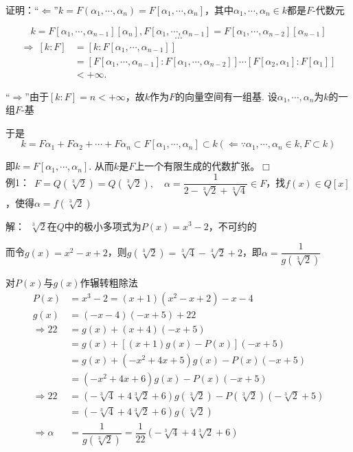 \documentclass[UTF8]{article}
\begin{document}
证明：“$\Longleftarrow$”\quad $k=F\left( \alpha_1,\cdots,\alpha_n\right)=F\left[ \alpha_1,\cdots,\alpha_n\right]$，其中$\alpha_1,\cdots,\alpha_n\in k$都是$F$-代数元

$$k=F\left[ \alpha_1,\cdots,\alpha_{n-1}\right]\left[ \alpha_n\right],F\left[ \alpha_1,\cdots,\alpha_{n-1}\right]=F\left[ \alpha_1,\cdots,\alpha_{n-2}\right]\left[ \alpha_{n-1}\right]$$
$$\cdots$$
\[
\begin{split}
\Rightarrow\ \left[ k: F\right]&=\left[ k: F\left[ \alpha_1,\cdots,\alpha_{n-1}\right]\right]\\
&=\left[ F\left[ \alpha_1,\cdots,\alpha_{n-1}\right]: F\left[ \alpha_1,\cdots,\alpha_{n-2}\right]\right]\cdots\left[ F\left[ \alpha_2,\alpha_1\right]: F\left[ \alpha_1\right]\right]\\
&<+\infty.
\end{split}
\]

“$\Longrightarrow$”\quad 由于$[k: F]=n<+\infty$，故$k$作为$F$的向量空间有一组基.
设$\alpha_1,\cdots,\alpha_n$为$k$的一组$F$-基

于是
$$k=F\alpha_1+F\alpha_2+\cdots+F\alpha_n\subset F\left[ \alpha_1,\cdots,\alpha_n\right]\subset k(\Leftarrow \because \alpha_1,\cdots,\alpha_n\in k, F\subset k)$$

即$k=F\left[ \alpha_1,\cdots,\alpha_n\right]$.
从而$k$是$F$上一个有限生成的代数扩张。\hfill$\Box$\\


例1：\ $F=Q\left( \sqrt[3]{2}\right)=Q\left( \sqrt[3]{2}\right),\quad \alpha=\dfrac{1}{2-\sqrt[3]{2}+\sqrt[3]{4}}\in F$，找$f(x)\in Q[x]$，使得$\alpha=f\left( \sqrt[3]{2}\right)$

解：\quad\ $\sqrt[3]{2}$在$Q$中的极小多项式为$P(x)=x^3-2$，不可约的

\quad 而令$g(x)=x^2-x+2$，则$g\left( \sqrt[3]{2}\right)=\sqrt[3]{4}-\sqrt[3]{2}+2$，即$\alpha=\dfrac{1}{g\left( \sqrt[3]{2}\right)}$

\quad 对$P(x)$与$g(x)$作辗转粗除法
$$
\begin{aligned}
P(x)&=x^{3}-2=(x+1)\left(x^{2}-x+2\right)-x-4\\ 
g(x)&=(-x-4)(-x+5)+22\\ 
\Rightarrow 22&=g(x)+(x+4)(-x+5)\\ 
&=g(x)+[(x+1) g(x)-P(x)](-x+5)\\ 
&=g(x)+\left(-x^{2}+4 x+5\right) g(x)-P(x)(-x+5)\\
&=\left(-x^{2}+4 x+6\right) g(x)-P(x)(-x+5)\\ 
\Rightarrow 22&=\left(-\sqrt[3]{4}+4\sqrt[3]{2}+6\right) g(\sqrt[3]{2})-P(\sqrt[3]{2})(-\sqrt[3]{2}+5)\\ 
&=\left(-\sqrt[3]{4}+4\sqrt[3]{2}+6\right) g(\sqrt[3]{2})\\ 
\Rightarrow\alpha&=\dfrac{1}{g\left(\sqrt[3]{2}\right)}=\dfrac{1}{22}\left(-\sqrt[3]{4}+4\sqrt[3]{2}+6\right)
\end{aligned}
$$
\end{document}
